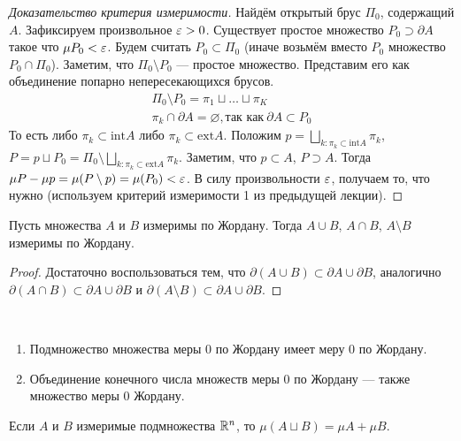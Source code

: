 \begin{proof}[Доказательство критерия измеримости]
Найдём открытый брус $\Pi_0$, содержащий $A$. Зафиксируем произвольное $\varepsilon >0$. Существует простое множество $P_0\supset \partial A$ такое что $\mu P_0 < \varepsilon$. Будем считать $P_0 \subset \Pi_0$ (иначе возьмём вместо $P_0$ множество $P_0\cap \Pi_0$). Заметим, что $\Pi_0 \setminus P_0$ --- простое множество. Представим его как объединение попарно непересекающихся брусов.
\begin{gather}
    \Pi_0 \setminus P_0 = \pi_1 \sqcup \ldots \sqcup \pi_K\\
    \pi_k \cap \partial A = \varnothing, \text{так как}\ \partial A \subset P_0
\end{gather}
То есть либо $\pi_k \subset \mathrm{int}A$ либо $\pi_k \subset \mathrm{ext}A$. Положим $p = \bigsqcup\limits_{k\colon \pi_k \subset \mathrm{int}A} \pi_k$, $P = p \sqcup P_0 = \Pi_0 \setminus \bigsqcup\limits_{k\colon \pi_k \subset \mathrm{ext}A}\pi_k$.
Заметим, что $p \subset A$, $P\supset A$. Тогда $\mu P - \mu p = \mu(P \setminus p) = \mu(P_0) < \varepsilon$. В силу произвольности $\varepsilon$, получаем то, что нужно  (используем критерий измеримости 1 из предыдущей лекции).
\end{proof}
\begin{Consequence}
Пусть множества $A$ и $B$ измеримы по Жордану. Тогда $A \cup B$, $A \cap B$, $A \setminus B$ измеримы по Жордану.
\end{Consequence}
\begin{proof}
    Достаточно воспользоваться тем, что $\partial (A\cup B) \subset \partial A\cup \partial B$, аналогично$ \partial (A\cap B) \subset \partial A\cup \partial B  $ и $\partial (A\setminus B) \subset \partial A\cup \partial B  $.
\end{proof}
\begin{Comment}\ 
\begin{enumerate}
    \item Подмножество множества меры 0 по Жордану имеет меру 0 по Жордану.
    \item Объединение конечного числа множеств меры 0 по Жордану --- также множество меры 0 Жордану.
\end{enumerate}
\end{Comment}
\begin{Statement}
Если $A$ и $B$ измеримые подмножества $\mathbb{R}^n$, то $\mu(A \sqcup B) = \mu A + \mu B$.
\end{Statement}
